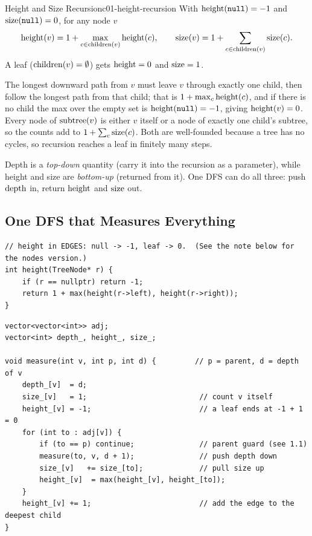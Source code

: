 \begin{theorem}{Height and Size Recursion}{c01-height-recursion}
With $\operatorname{height}(\texttt{null})=-1$ and $\operatorname{size}(\texttt{null})=0$, for any node $v$
\[
  \operatorname{height}(v) = 1 + \max_{c \in \operatorname{children}(v)} \operatorname{height}(c),
  \qquad
  \operatorname{size}(v) = 1 + \sum_{c \in \operatorname{children}(v)} \operatorname{size}(c).
\]
A leaf ($\operatorname{children}(v)=\emptyset$) gets $\operatorname{height}=0$ and $\operatorname{size}=1$.
\end{theorem}
\begin{proofbox}
The longest downward path from $v$ must leave $v$ through exactly one child, then follow
the longest path from that child; that is $1+\max_c \operatorname{height}(c)$, and if there is no child
the max over the empty set is $\operatorname{height}(\texttt{null})=-1$, giving $\operatorname{height}(v)=0$. Every node of
$\operatorname{subtree}(v)$ is either $v$ itself or a node of exactly one child's subtree, so the counts
add to $1+\sum_c \operatorname{size}(c)$. Both are well-founded because a tree has no cycles, so
recursion reaches a leaf in finitely many steps.
\end{proofbox}
\begin{insightbox}
Depth is a \emph{top-down} quantity (carry it into the recursion as a parameter), while
height and size are \emph{bottom-up} (returned from it). One DFS can do all three: push
$\operatorname{depth}$ in, return $\operatorname{height}$ and $\operatorname{size}$ out.
\end{insightbox}


\subsection{One DFS that Measures Everything}

\begin{lstlisting}[caption={Height of a binary tree (height in edges, height(null) = -1)}, label={lst:c01-height}]
// height in EDGES: null -> -1, leaf -> 0.  (See the note below for the nodes version.)
int height(TreeNode* r) {
    if (r == nullptr) return -1;
    return 1 + max(height(r->left), height(r->right));
}
\end{lstlisting}

\begin{lstlisting}[caption={One DFS that fills depth, height and size for a general tree}, label={lst:c01-measure}]
vector<vector<int>> adj;
vector<int> depth_, height_, size_;

void measure(int v, int p, int d) {         // p = parent, d = depth of v
    depth_[v]  = d;
    size_[v]   = 1;                          // count v itself
    height_[v] = -1;                         // a leaf ends at -1 + 1 = 0
    for (int to : adj[v]) {
        if (to == p) continue;               // parent guard (see 1.1)
        measure(to, v, d + 1);               // push depth down
        size_[v]   += size_[to];             // pull size up
        height_[v]  = max(height_[v], height_[to]);
    }
    height_[v] += 1;                         // add the edge to the deepest child
}
\end{lstlisting}


